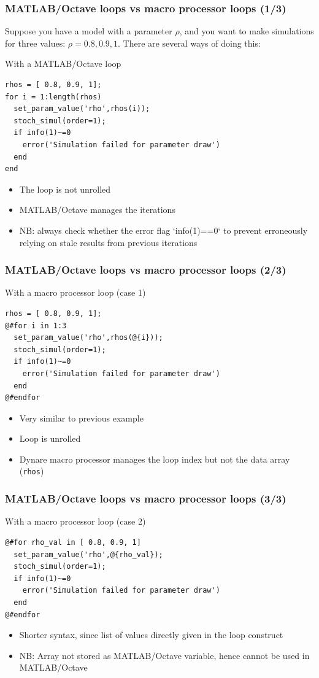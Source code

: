 \documentclass[aspectratio=169]{beamer}
\begin{document}
\begin{frame}[fragile=singleslide]
  \frametitle{MATLAB/Octave loops vs macro processor loops (1/3)}
  Suppose you have a model with a parameter $\rho$, and you want to make
  simulations for three values: $\rho = 0.8, 0.9, 1$. There are
  several ways of doing this:
  \begin{block}{With a MATLAB/Octave loop}
\begin{verbatim}
rhos = [ 0.8, 0.9, 1];
for i = 1:length(rhos)
  set_param_value('rho',rhos(i));
  stoch_simul(order=1);
  if info(1)~=0
    error('Simulation failed for parameter draw')
  end
end
\end{verbatim}
  \end{block}
  \begin{itemize}
  \item The loop is not unrolled
  \item MATLAB/Octave manages the iterations
  \item NB: always check whether the error flag `info(1)==0` to prevent erroneously relying on stale results from previous iterations
  \end{itemize}
\end{frame}

\begin{frame}[fragile=singleslide]
  \frametitle{MATLAB/Octave loops vs macro processor loops (2/3)}
  \begin{block}{With a macro processor loop (case 1)}
\begin{verbatim}
rhos = [ 0.8, 0.9, 1];
@#for i in 1:3
  set_param_value('rho',rhos(@{i}));
  stoch_simul(order=1);
  if info(1)~=0
    error('Simulation failed for parameter draw')
  end
@#endfor
\end{verbatim}
  \end{block}
  \begin{itemize}
  \item Very similar to previous example
  \item Loop is unrolled
  \item Dynare macro processor manages the loop index but not the data array (\texttt{rhos})
  \end{itemize}
\end{frame}

\begin{frame}[fragile=singleslide]
  \frametitle{MATLAB/Octave loops vs macro processor loops (3/3)}
  \begin{block}{With a macro processor loop (case 2)}
\begin{verbatim}
@#for rho_val in [ 0.8, 0.9, 1]
  set_param_value('rho',@{rho_val});
  stoch_simul(order=1);
  if info(1)~=0
    error('Simulation failed for parameter draw')
  end
@#endfor
\end{verbatim}
  \end{block}
  \begin{itemize}
  \item Shorter syntax, since list of values directly given in the loop construct
  \item NB: Array not stored as MATLAB/Octave variable, hence cannot be used in MATLAB/Octave
  \end{itemize}
\end{frame}
\end{document}
